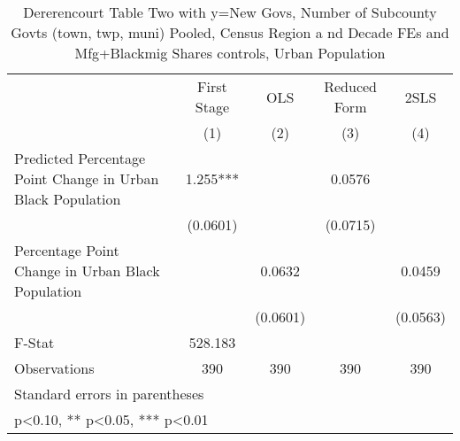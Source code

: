\begin{table}[htbp]\centering
\def\sym#1{\ifmmode^{#1}\else\(^{#1}\)\fi}
\caption{Dererencourt Table Two with y=New Govs, Number of Subcounty Govts (town, twp, muni)  Pooled, Census Region a nd Decade FEs and Mfg+Blackmig Shares controls, Urban Population}
\begin{tabular}{l*{4}{c}}
\toprule
                    & First Stage   &         OLS   &Reduced Form   &        2SLS   \\
                    &\multicolumn{1}{c}{(1)}   &\multicolumn{1}{c}{(2)}   &\multicolumn{1}{c}{(3)}   &\multicolumn{1}{c}{(4)}   \\
\midrule
Predicted Percentage Point Change in Urban Black Population&       1.255***&               &      0.0576   &               \\
                    &    (0.0601)   &               &    (0.0715)   &               \\
\addlinespace
Percentage Point Change in Urban Black Population&               &      0.0632   &               &      0.0459   \\
                    &               &    (0.0601)   &               &    (0.0563)   \\
\midrule
F-Stat              &     528.183   &               &               &               \\
Observations        &         390   &         390   &         390   &         390   \\
\bottomrule
\multicolumn{5}{l}{\footnotesize Standard errors in parentheses}\\
\multicolumn{5}{l}{\footnotesize * p<0.10, ** p<0.05, *** p<0.01}\\
\end{tabular}
\end{table}
